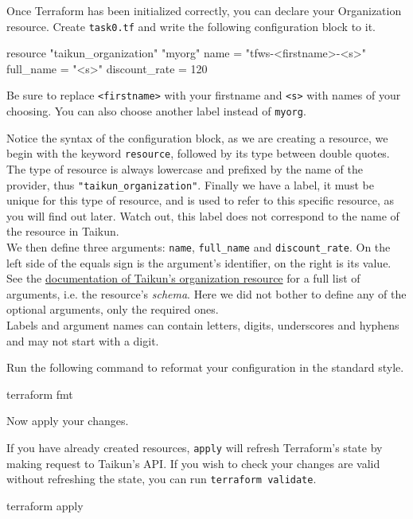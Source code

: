 Once Terraform has been initialized correctly, you can declare your Organization resource.
Create \texttt{task0.tf} and write the following configuration block to it.
\begin{tf}
resource "taikun_organization" "myorg" {
  name          = "tfws-<firstname>-<s>"
  full_name     = "<s>"
  discount_rate = 120
}
\end{tf}
Be sure to replace \texttt{<firstname>} with your firstname and \texttt{<s>} with
names of your choosing. You can also choose another label instead of \texttt{myorg}.

\begin{info}
Notice the syntax of the configuration block, as we are creating a resource,
we begin with the keyword \texttt{resource}, followed by its type between double quotes.
The type of resource is always lowercase and prefixed by the name of the provider,
thus \texttt{"taikun\_organization"}.
Finally we have a label, it must be unique for this type of resource, and is used
to refer to this specific resource, as you will find out later.
Watch out, this label does not correspond to the name of the resource in Taikun.\\

We then define three arguments: \texttt{name}, \texttt{full\_name} and \texttt{discount\_rate}.
On the left side of the equals sign is the argument's identifier, on the right is its value.
See the \href{https://intuinewin.github.io/taikun-docs/resources/organization.html}{documentation of Taikun's organization resource} for a full list of arguments, i.e. the resource's \textit{schema}.
Here we did not bother to define any of the optional arguments, only the required ones.\\

Labels and argument names can contain letters, digits, underscores and hyphens and may not start with a digit.
\end{info}
Run the following command to reformat your configuration in the standard style.
\begin{shell}
terraform fmt
\end{shell}
Now apply your changes.
\begin{info}
If you have already created resources, \texttt{apply} will refresh Terraform's state
by making request to Taikun's API. If you wish to check your changes are valid
without refreshing the state, you can run \texttt{terraform validate}.
\end{info}
\begin{shell}
terraform apply
\end{shell}
